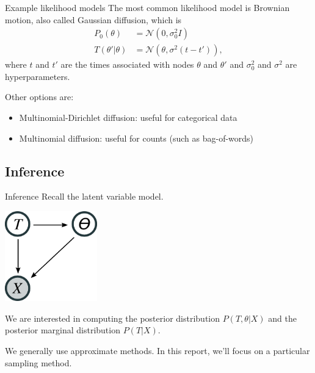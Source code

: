 \documentclass[10pt, compress]{beamer}
\begin{document}
\begin{frame}{Example likelihood models}
  The most common likelihood model is \alert{Brownian motion},
  also called Gaussian diffusion, which is
  \begin{align}
    P_0(\theta) &= \mathcal{N}(0, \sigma_0^2I) \\
    T(\theta' | \theta) &= \mathcal{N}(\theta, \sigma^2(t - t')),
  \end{align}
  where $t$ and $t'$ are the times associated with nodes
  $\theta$ and $\theta'$ and $\sigma_0^2$ and $\sigma^2$ are hyperparameters.

  \pause

  Other options are:
  \begin{itemize}
    \item Multinomial-Dirichlet diffusion: useful for
      categorical data
    \item Multinomial diffusion: useful for
      counts (such as bag-of-words)
  \end{itemize}
\end{frame}

\subsection{Inference}
\begin{frame}{Inference}
  Recall the latent variable model.
  \begin{center}
    \includegraphics[width=0.3\textwidth]{img/bhc-lvm}
  \end{center}
  \pause

  We are interested in computing the posterior distribution
  $P(T, \theta | X)$ and the posterior marginal distribution
  $P(T | X)$.

  \pause

  We generally use approximate methods.
  In this report, we'll focus on a particular sampling method.
\end{frame}
\end{document}
